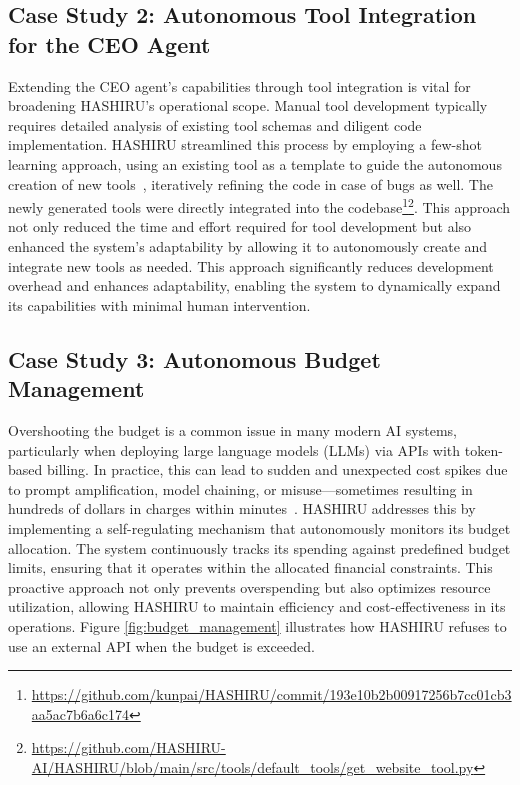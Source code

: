 \documentclass[conference]{IEEEtran}
\begin{document}
\subsection{Case Study 2: Autonomous Tool Integration for the CEO Agent}
\label{sec:casestudy2_tools}
Extending the CEO agent's capabilities through tool integration is vital for broadening HASHIRU's operational scope. Manual tool development typically requires detailed analysis of existing tool schemas and diligent code implementation. HASHIRU streamlined this process by employing a few-shot learning approach, using an existing tool as a template to guide the autonomous creation of new tools~\cite{brown2020language}, iteratively refining the code in case of bugs as well. The newly generated tools were directly integrated into the codebase\footnote{\url{https://github.com/kunpai/HASHIRU/commit/193e10b2b00917256b7cc01cb3aa5ac7b6a6c174}}\footnote{\url{https://github.com/HASHIRU-AI/HASHIRU/blob/main/src/tools/default_tools/get_website_tool.py}}. This approach not only reduced the time and effort required for tool development but also enhanced the system's adaptability by allowing it to autonomously create and integrate new tools as needed.
This approach significantly reduces development overhead and enhances adaptability, enabling the system to dynamically expand its capabilities with minimal human intervention.

\subsection{Case Study 3: Autonomous Budget Management}
\label{sec:casestudy3_budget}
Overshooting the budget is a common issue in many modern AI systems, particularly when deploying large language models (LLMs) via APIs with token-based billing.
In practice, this can lead to sudden and unexpected cost spikes due to prompt amplification, model chaining, or misuse—sometimes resulting in hundreds of dollars in charges within minutes~\cite{gemini_reddit,openai_sos,openai_costs}.
HASHIRU addresses this by implementing a self-regulating mechanism that autonomously monitors its budget allocation.
The system continuously tracks its spending against predefined budget limits, ensuring that it operates within the allocated financial constraints.
This proactive approach not only prevents overspending but also optimizes resource utilization, allowing HASHIRU to maintain efficiency and cost-effectiveness in its operations.
Figure \ref{fig:budget_management} illustrates how HASHIRU refuses to use an external API when the budget is exceeded.
\end{document}
